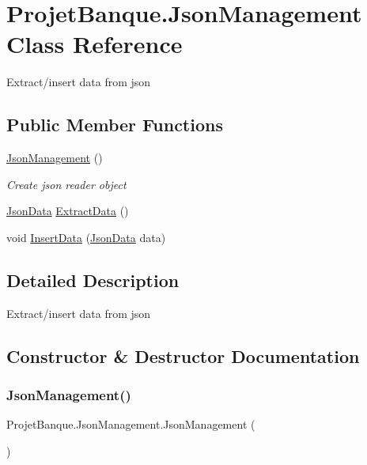 \hypertarget{class_projet_banque_1_1_json_management}{}\section{Projet\+Banque.\+Json\+Management Class Reference}
\label{class_projet_banque_1_1_json_management}


Extract/insert data from json  


\subsection*{Public Member Functions}
\begin{DoxyCompactItemize}
\item 
\mbox{\hyperlink{class_projet_banque_1_1_json_management_a47b15a935ba2fc015b7d3b7acb19358d}{Json\+Management}} ()
\begin{DoxyCompactList}\small\item\em Create json reader object \end{DoxyCompactList}\item 
\mbox{\hyperlink{class_projet_banque_1_1_json_data}{Json\+Data}} \mbox{\hyperlink{class_projet_banque_1_1_json_management_a652a9eb08a2f0a52d6c5b43471ca2944}{Extract\+Data}} ()
\item 
void \mbox{\hyperlink{class_projet_banque_1_1_json_management_ab7c696c086a0c83cd6e666b40a57e192}{Insert\+Data}} (\mbox{\hyperlink{class_projet_banque_1_1_json_data}{Json\+Data}} data)
\end{DoxyCompactItemize}


\subsection{Detailed Description}
Extract/insert data from json 



\subsection{Constructor \& Destructor Documentation}
\mbox{\label{class_projet_banque_1_1_json_management_a47b15a935ba2fc015b7d3b7acb19358d}} 
\subsubsection{\texorpdfstring{JsonManagement()}{JsonManagement()}}
{\footnotesize\ttfamily Projet\+Banque.\+Json\+Management.\+Json\+Management (\begin{DoxyParamCaption}{ }\end{DoxyParamCaption})}



